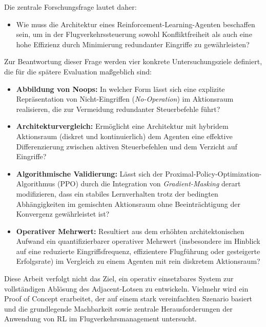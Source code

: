 Die zentrale Forschungsfrage lautet daher:
\begin{itemize}
    \item Wie muss die Architektur eines Reinforcement-Learning-Agenten beschaffen sein, um in der Flugverkehrssteuerung sowohl Konfliktfreiheit als auch eine hohe Effizienz durch Minimierung redundanter Eingriffe zu gewährleisten?
\end{itemize}

Zur Beantwortung dieser Frage werden vier konkrete Untersuchungsziele definiert, die für die spätere Evaluation maßgeblich sind:
\begin{itemize}
    \item \textbf{Abbildung von Noops:} In welcher Form lässt sich eine explizite Repräsentation von Nicht-Eingriffen (\emph{No-Operation}) im Aktionsraum realisieren, die zur Vermeidung redundanter Steuerbefehle führt?
    \item \textbf{Architekturvergleich:} Ermöglicht eine Architektur mit hybridem Aktionsraum (diskret und kontinuierlich) dem Agenten eine effektive Differenzierung zwischen aktiven Steuerbefehlen und dem Verzicht auf Eingriffe?
    \item \textbf{Algorithmische Validierung:} Lässt sich der Proximal-Policy-Op\-ti\-mi\-za\-tion-Algorithmus (\acs{PPO}) durch die Integration von \emph{Gradient\hyp{}Masking} derart modifizieren, dass ein stabiles Lernverhalten trotz der bedingten Abhängigkeiten im gemischten Aktionsraum ohne Beeinträchtigung der Konvergenz gewährleistet ist?
    \item \textbf{Operativer Mehrwert:} Resultiert aus dem erhöhten architektonischen Aufwand ein quantifizierbarer operativer Mehrwert (insbesondere im Hinblick auf eine reduzierte Eingriffsfrequenz, effizientere Flugführung oder gesteigerte Erfolgsrate) im Vergleich zu einem Agenten mit rein diskretem Aktionsraum?
\end{itemize}


Diese Arbeit verfolgt nicht das Ziel, ein operativ einsetzbares System zur vollständigen Ablösung des Adjacent-Lotsen zu entwickeln. 
Vielmehr wird ein Proof of Concept erarbeitet, der auf einem stark vereinfachten Szenario basiert und die grundlegende Machbarkeit sowie zentrale Herausforderungen der Anwendung von \ac{RL} im Flugverkehrsmanagement untersucht.
%
